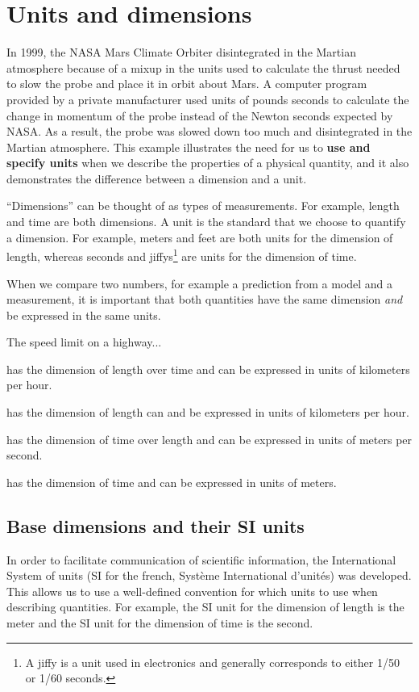 \section{Units and dimensions}
In 1999, the NASA Mars Climate Orbiter disintegrated in the Martian atmosphere because of a mixup in the units used to calculate the thrust needed to slow the probe and place it in orbit about Mars. A computer program provided by a private manufacturer used units of pounds seconds to calculate the change in momentum of the probe instead of the Newton seconds expected by NASA. As a result, the probe was slowed down too much and disintegrated in the Martian atmosphere. This example illustrates the need for us to \textbf{use and specify units} when we describe the properties of a physical quantity, and it also demonstrates the difference between a dimension and a unit.

``Dimensions'' can be thought of as types of measurements. For example, length and time are both dimensions. A unit is the standard that we choose to quantify a dimension. For example, meters and feet are both units for the dimension of length, whereas seconds and jiffys\footnote{A jiffy is a unit used in electronics and generally corresponds to either 1/50 or 1/60 seconds.} are units for the dimension of time.

When we compare two numbers, for example a prediction from a model and a measurement, it is important that both quantities have the same dimension \textit{and} be expressed in the same units.
\begin{checkpoint}
\begin{MCquestion}{The speed limit on a highway...}
\item has the dimension of length over time and can be expressed in units of kilometers per hour. \correct
\item has the dimension of length can and be expressed in units of kilometers per hour.
\item has the dimension of time over length and can be expressed in units of meters per second.
\item has the dimension of time and can be expressed in units of meters.
\end{MCquestion}
\end{checkpoint}

\subsection{Base dimensions and their SI units}
In order to facilitate communication of scientific information, the International System of units (SI for the french, Syst\`eme International d'unit\'es) was developed. This allows us to use a well-defined convention for which units to use when describing quantities. For example, the SI unit for the dimension of length is the meter and the SI unit for the dimension of time is the second.

